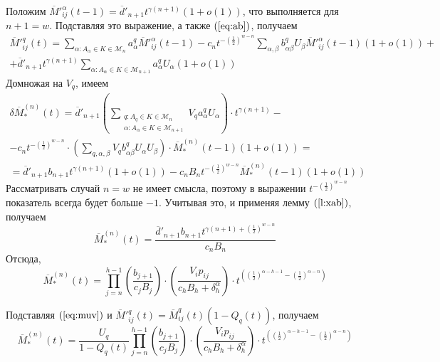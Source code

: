 \documentclass[12pt]{article}
\begin{document}
{Положим $\overline{M}'^\alpha_{ij}(t-1) = \overline{d}'_{n+1} t^{\gamma(n+1)} (1 + o(1))$, что выполняется для $n+1 = w$. Подставляя это выражение, а также $(\ref{eq:ab})$, получаем
\begin{multline*}
	\overline{M}'^q_{ij}(t) = \sum_{\alpha : A_\alpha \in K \in \mathcal{M}_n} a^q_\alpha \overline{M}'^\alpha_{ij}(t-1) - c_n t^{-\left(\frac{1}{2}\right)^{w-n}} \sum_{\alpha,\beta} b^q_{\alpha \beta} U_\beta \overline{M}'^\alpha_{ij}(t-1) (1 + o(1)) + \\
	+ \overline{d}'_{n+1} t^{\gamma(n+1)} \sum_{\alpha : A_\alpha \in K \in \mathcal{M}_{n+1}} a^q_\alpha U_\alpha (1 + o(1))
\end{multline*}
Домножая на $V_q$, имеем
\begin{multline*}
	\delta \overline{M}^{(n)}_*(t) = \overline{d}'_{n+1} \left( \sum_{\substack{q : A_q \in K \in \mathcal{M}_n \\ \alpha : A_\alpha \in K \in \mathcal{M}_{n+1}}} V_q a^q_\alpha U_\alpha \right) \cdot t^{\gamma(n+1)} - \\
	- c_n t^{-\left(\frac{1}{2}\right)^{w-n}} \cdot \left( \sum_{q,\alpha,\beta} V_q b^q_{\alpha \beta} U_\alpha U_\beta \right) \cdot \overline{M}^{(n)}_*(t-1) (1 + o(1)) = \\
	= \overline{d}'_{n+1} b_{n+1} t^{\gamma(n+1)} (1 + o(1)) - c_n B_n t^{-\left(\frac{1}{2}\right)^{w-n}} \overline{M}^{(n)}_*(t-1) (1 + o(1))
\end{multline*}
Рассматривать случай $n = w$ не имеет смысла, поэтому в выражении $t^{-\left(\frac{1}{2}\right)^{w-n}}$ показатель всегда будет больше $-1$. Учитывая это, и применяя лемму $(\ref{l:xab})$, получаем
\begin{equation*}
	\overline{M}^{(n)}_*(t) = \frac{\overline{d}'_{n+1} b_{n+1} t^{\gamma(n+1) + \left(\frac{1}{2}\right)^{w-n}}}{c_n B_n}
\end{equation*}
Отсюда,
\begin{equation*}
	\overline{M}^{(n)}_*(t) = \prod_{j = n}^{h-1} \left( \frac{b_{j+1}}{c_j B_j} \right) \cdot \left( \frac{V_i p_{ij}}{c_h B_h + \delta^\alpha_h} \right) \cdot t^{\left( \left(\frac{1}{2}\right)^{\alpha - h - 1} - \left(\frac{1}{2}\right)^{\alpha - n} \right)}
\end{equation*}

Подставляя $(\ref{eq:muv})$ и $\overline{M}'^q_{ij}(t) = \overline{M}^q_{ij}(t) (1 - Q_q(t))$, получаем
\begin{equation*}
	\overline{M}^{(n)}_*(t) = \frac{U_q}{1 - Q_q(t)} \prod_{j = n}^{h-1} \left( \frac{b_{j+1}}{c_j B_j} \right) \cdot \left( \frac{V_i p_{ij}}{c_h B_h + \delta^\alpha_h} \right) \cdot t^{\left( \left(\frac{1}{2}\right)^{\alpha - h - 1} - \left(\frac{1}{2}\right)^{\alpha - n} \right)}
\end{equation*}

}
\end{document}
